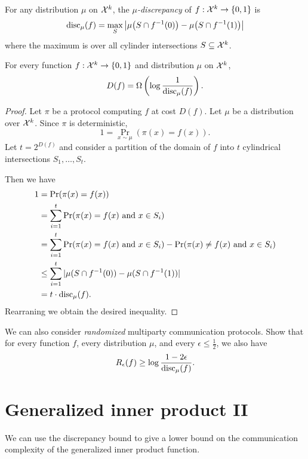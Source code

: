 \begin{definition}
For any distribution $\mu$ on $\mathcal{X}^k$, 
the \emph{$\mu$-discrepancy} of $f : \mathcal{X}^k \to \{0,1\}$ is
\[
\mathrm{disc}_\mu(f) = \max_{S} 
\left| \mu\big( S \cap f^{-1}(0) \big) - \mu\big( S \cap f^{-1}(1)\big) \right|
\]
where the maximum is over all cylinder intersections $S \subseteq \mathcal{X}^k$.
\end{definition}


\begin{lemma}
For every function $f : \mathcal{X}^k \to \{0,1\}$ and distribution $\mu$ on $\mathcal{X}^k$,
\[
D(f) = \Omega\left( \log \frac{1}{\mathrm{disc}_\mu(f)}\right).
\]
\end{lemma}

\begin{proof}
Let $\pi$ be a protocol computing $f$ at cost $D(f)$. Let $\mu$ be a distribution over $\mathcal{X}^k$. Since $\pi$ is deterministic,
$$1 = \Pr_{x\sim \mu}(\pi(x) = f(x)).$$
Let $t = 2^{D(f)}$ and consider a partition of the domain of $f$ into $t$ cylindrical intersections $S_1, \dots, S_t$.

Then we have
\begin{align*}
1 &=\Pr(\pi(x) = f(x))\\
&=\sum_{i=1}^t\Pr(\pi(x) = f(x)\text{ and } x\in S_i) \\
&= \sum_{i=1}^t\Pr(\pi(x) = f(x)\text{ and } x\in S_i) - \Pr(\pi(x) \neq f(x)\text{ and } x\in S_i)\\
&\leq \sum_{i=1}^t|\mu(S\cap f^{-1}(0)) - \mu(S\cap f^{-1}(1))|\\
&= t\cdot \mathrm{disc}{_\mu}(f).
\end{align*}
Rearraning we obtain the desired inequality.
\end{proof}

\exercises

\begin{exercise}
We can also consider \emph{randomized} multiparty communication protocols. Show that for every function $f$, every distribution $\mu$, and every $\epsilon \le \frac12$, we also have
\[
R_\epsilon(f) \ge \log \frac{1-2\epsilon}{\mathrm{disc}_\mu(f)}.
\]
\end{exercise}


\newpage 
\section{Generalized inner product II}

We can use the discrepancy bound to give a lower bound on the communication complexity of the generalized inner product function.

